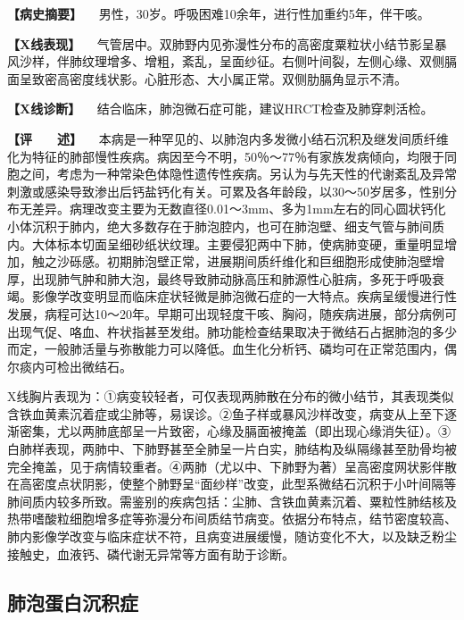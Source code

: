 \textbf{【病史摘要】}
　男性，30岁。呼吸困难10余年，进行性加重约5年，伴干咳。

\textbf{【X线表现】}
　气管居中。双肺野内见弥漫性分布的高密度粟粒状小结节影呈暴风沙样，伴肺纹理增多、增粗，紊乱，呈面纱征。右侧叶间裂，左侧心缘、双侧膈面呈致密高密度线状影。心脏形态、大小属正常。双侧肋膈角显示不清。

\textbf{【X线诊断】}
　结合临床，肺泡微石症可能，建议HRCT检查及肺穿刺活检。

\textbf{【评　　述】}
　本病是一种罕见的、以肺泡内多发微小结石沉积及继发间质纤维化为特征的肺部慢性疾病。病因至今不明，50％～77％有家族发病倾向，均限于同胞之间，考虑为一种常染色体隐性遗传性疾病。另认为与先天性的代谢紊乱及异常刺激或感染导致渗出后钙盐钙化有关。可累及各年龄段，以30～50岁居多，性别分布无差异。病理改变主要为无数直径0.01～3mm、多为1mm左右的同心圆状钙化小体沉积于肺内，绝大多数存在于肺泡腔内，也可在肺泡壁、细支气管与肺间质内。大体标本切面呈细砂纸状纹理。主要侵犯两中下肺，使病肺变硬，重量明显增加，触之沙砾感。初期肺泡壁正常，进展期间质纤维化和巨细胞形成使肺泡壁增厚，出现肺气肿和肺大泡，最终导致肺动脉高压和肺源性心脏病，多死于呼吸衰竭。影像学改变明显而临床症状轻微是肺泡微石症的一大特点。疾病呈缓慢进行性发展，病程可达10～20年。早期可出现轻度干咳、胸闷，随疾病进展，部分病例可出现气促、咯血、杵状指甚至发绀。肺功能检查结果取决于微结石占据肺泡的多少而定，一般肺活量与弥散能力可以降低。血生化分析钙、磷均可在正常范围内，偶尔痰内可检出微结石。

X线胸片表现为：①病变较轻者，可仅表现两肺散在分布的微小结节，其表现类似含铁血黄素沉着症或尘肺等，易误诊。②鱼子样或暴风沙样改变，病变从上至下逐渐密集，尤以两肺底部呈一片致密，心缘及膈面被掩盖（即出现心缘消失征）。③白肺样表现，两肺中、下肺野甚至全肺呈一片白实，肺结构及纵隔缘甚至肋骨均被完全掩盖，见于病情较重者。④两肺（尤以中、下肺野为著）呈高密度网状影伴散在高密度点状阴影，使整个肺野呈“面纱样”改变，此型系微结石沉积于小叶间隔等肺间质内较多所致。需鉴别的疾病包括：尘肺、含铁血黄素沉着、粟粒性肺结核及热带嗜酸粒细胞增多症等弥漫分布间质结节病变。依据分布特点，结节密度较高、肺内影像学改变与临床症状不符，且病变进展缓慢，随访变化不大，以及缺乏粉尘接触史，血液钙、磷代谢无异常等方面有助于诊断。

\subsection{肺泡蛋白沉积症}

